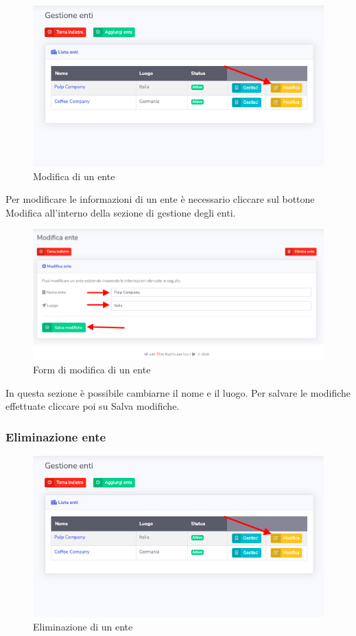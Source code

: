 		\begin{figure}[H]
		\centering
		\includegraphics[scale=0.600]{res/images/admin/selModEnte.png}
		\caption{Modifica di un ente}
	\end{figure}

		Per modificare le informazioni di un ente è necessario cliccare sul bottone Modifica all'interno della sezione di gestione degli enti.

		\begin{figure}[H]
		\centering
		\includegraphics[scale=0.480]{res/images/admin/modEnte.png}
		\caption{Form di modifica di un ente}
	\end{figure}

		In questa sezione è possibile cambiarne il nome e il luogo. Per salvare le modifiche effettuate cliccare poi su Salva modifiche.

	\subsubsection{Eliminazione ente}	

		\begin{figure}[H]
		\centering
		\includegraphics[scale=0.600]{res/images/admin/selModEnte.png}
		\caption{Eliminazione di un ente}
	\end{figure}


